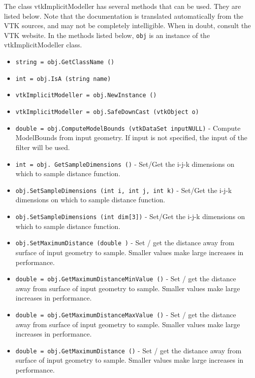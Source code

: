 The class vtkImplicitModeller has several methods that can be used.
  They are listed below.
Note that the documentation is translated automatically from the VTK sources,
and may not be completely intelligible.  When in doubt, consult the VTK website.
In the methods listed below, \verb|obj| is an instance of the vtkImplicitModeller class.
\begin{itemize}
\item  \verb|string = obj.GetClassName ()|

\item  \verb|int = obj.IsA (string name)|

\item  \verb|vtkImplicitModeller = obj.NewInstance ()|

\item  \verb|vtkImplicitModeller = obj.SafeDownCast (vtkObject o)|

\item  \verb|double = obj.ComputeModelBounds (vtkDataSet inputNULL)| -  Compute ModelBounds from input geometry. If input is not specified, the
 input of the filter will be used.

\item  \verb|int = obj. GetSampleDimensions ()| -  Set/Get the i-j-k dimensions on which to sample distance function.

\item  \verb|obj.SetSampleDimensions (int i, int j, int k)| -  Set/Get the i-j-k dimensions on which to sample distance function.

\item  \verb|obj.SetSampleDimensions (int dim[3])| -  Set/Get the i-j-k dimensions on which to sample distance function.

\item  \verb|obj.SetMaximumDistance (double )| -  Set / get the distance away from surface of input geometry to
 sample. Smaller values make large increases in performance.

\item  \verb|double = obj.GetMaximumDistanceMinValue ()| -  Set / get the distance away from surface of input geometry to
 sample. Smaller values make large increases in performance.

\item  \verb|double = obj.GetMaximumDistanceMaxValue ()| -  Set / get the distance away from surface of input geometry to
 sample. Smaller values make large increases in performance.

\item  \verb|double = obj.GetMaximumDistance ()| -  Set / get the distance away from surface of input geometry to
 sample. Smaller values make large increases in performance.


\end{itemize}

